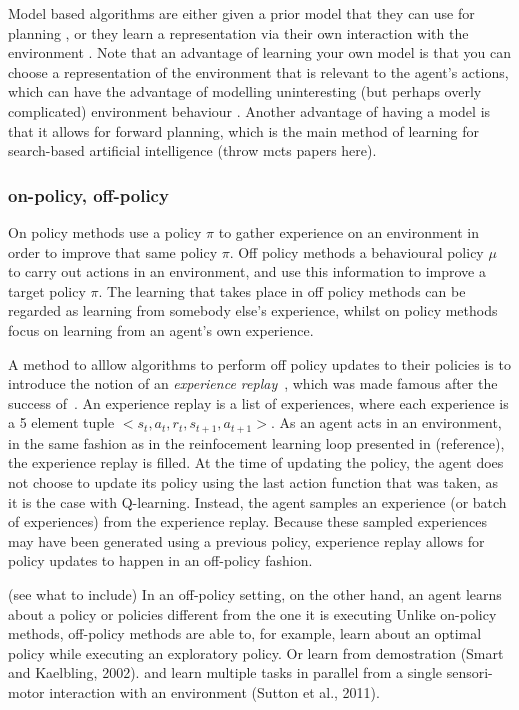 \documentclass{../main.tex}{subfiles}
\begin{document}
Model based algorithms are either given a prior model that they can use for planning \citep{browne2012survey, Soemers2014}, or they learn a representation via their own interaction with the environment \citep{Sutton1991, Guzdial2017}. Note that an advantage of learning your own model is that you can choose a representation of the environment that is relevant to the agent's actions, which can have the advantage of modelling uninteresting (but perhaps overly complicated) environment behaviour \citep{Pathak2017}. Another advantage of having a model is that it allows for forward planning, which is the main method of learning for search-based artificial intelligence (throw mcts papers here).


\subsubsection{on-policy, off-policy}
On policy methods use a policy $\pi$ to gather experience on an environment in order to improve that same policy $\pi$. Off policy methods a behavioural policy $\mu$ to carry out actions in an environment, and use this information to improve a target policy $\pi$. The learning that takes place in off policy methods can be regarded as learning from somebody else's experience, whilst on policy methods focus on learning from an agent's own experience.

A method to alllow algorithms to perform off policy updates to their policies is to introduce the notion of an \textit{experience replay}~\citep{Lin1993}, which was made famous after the success of~\cite{Mnih2013}. An experience replay is a list of experiences, where each experience is a 5 element tuple $<s_t, a_t, r_t, s_{t+1}, a_{t+1}>$. As an agent acts in an environment, in the same fashion as in the reinfocement learning loop presented in (reference), the experience replay is filled. At the time of updating the policy, the agent does not choose to update its policy using the last action function that was taken, as it is the case with Q-learning. Instead, the agent samples an experience (or batch of experiences) from the experience replay. Because these sampled experiences may have been generated using a previous policy, experience replay allows for policy updates to happen in an off-policy fashion.

(see what to include) In an off-policy setting, on the other hand, an agent learns about a policy or policies different from the one it is executing Unlike on-policy methods, off-policy methods are able to, for example, learn about an optimal policy while executing an exploratory policy. Or learn from demostration (Smart and Kaelbling, 2002).
and learn multiple tasks in parallel from a single sensori- motor interaction with an environment (Sutton et al., 2011).
\end{document}
